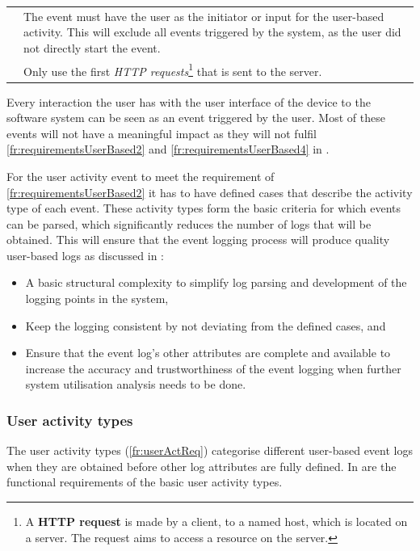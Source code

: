 \begin{xltabular}{\textwidth}{lX}
	 & The event must have the user as the initiator or input for the user-based activity. This will exclude all events triggered by the system, as the user did not directly start the event. \\
	
	 & Only use the first \textit{HTTP requests}\footnote{A \textbf{HTTP request} is made by a client, to a named host, which is located on a server. The request aims to access a resource on the server.} that is sent to the server. \\ 
	\bottomrule
\end{xltabular}

Every interaction the user has with the user interface of the device to the software system can be seen as an event triggered by the user. Most of these events will not have a meaningful impact as they will not fulfil \ref{fr:requirementsUserBased2} and \ref{fr:requirementsUserBased4} in .\par For the user activity event to meet the requirement of \ref{fr:requirementsUserBased2} it has to have defined cases that describe the activity type of each event. These activity types form the basic criteria for which events can be parsed, which significantly reduces the number of logs that will be obtained. This will ensure that the event logging process will produce quality user-based logs as discussed in :

\begin{itemize}
	\item A basic structural complexity to simplify log parsing and development of the logging points in the system,
	\item Keep the logging consistent by not deviating from the defined cases, and
	\item Ensure that the event log's other attributes are complete and available to increase the accuracy and trustworthiness of the event logging when further system utilisation analysis needs to be done. 
\end{itemize}

\subsubsection{User activity types}\label{sec:ch2_userActivityTypes}
The user activity types (\ref{fr:userActReq}) categorise different user-based event logs when they are obtained before other log attributes are fully defined. In  are the functional requirements of the basic user activity types.

